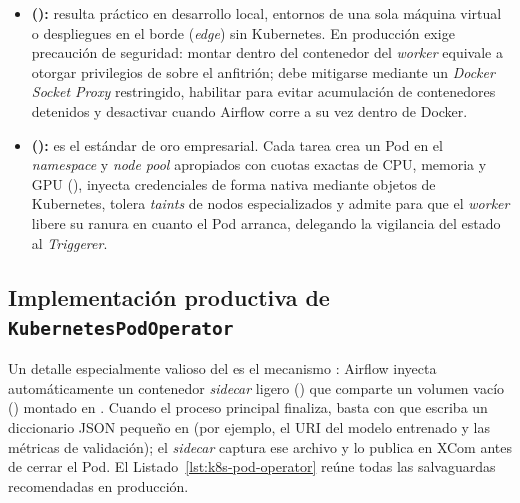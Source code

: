 \begin{itemize}
  \item \textbf{ ():} resulta práctico en desarrollo local, entornos de una sola máquina virtual o despliegues en el borde (\textit{edge}) sin Kubernetes. En producción exige precaución de seguridad: montar  dentro del contenedor del \textit{worker} equivale a otorgar privilegios de  sobre el anfitrión; debe mitigarse mediante un \textit{Docker Socket Proxy} restringido, habilitar  para evitar acumulación de contenedores detenidos y desactivar  cuando Airflow corre a su vez dentro de Docker.
  \item \textbf{ ():} es el estándar de oro empresarial. Cada tarea crea un Pod en el \textit{namespace} y \textit{node pool} apropiados con cuotas exactas de CPU, memoria y GPU (), inyecta credenciales de forma nativa mediante objetos  de Kubernetes, tolera \textit{taints} de nodos especializados y admite  para que el \textit{worker} libere su ranura en cuanto el Pod arranca, delegando la vigilancia del estado al \textit{Triggerer}.
\end{itemize}

\subsection{Implementación productiva de \texttt{KubernetesPodOperator}}

Un detalle especialmente valioso del  es el mecanismo : Airflow inyecta automáticamente un contenedor \textit{sidecar} ligero () que comparte un volumen vacío () montado en . Cuando el proceso principal finaliza, basta con que escriba un diccionario JSON pequeño en  (por ejemplo, el URI del modelo entrenado y las métricas de validación); el \textit{sidecar} captura ese archivo y lo publica en XCom antes de cerrar el Pod. El Listado~\ref{lst:k8s-pod-operator} reúne todas las salvaguardas recomendadas en producción.

